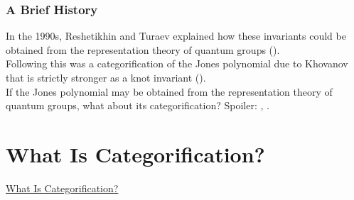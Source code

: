 \documentclass{beamer}
\begin{document}
\begin{frame}
\frametitle{A Brief History}
In the 1990s, Reshetikhin and Turaev explained how these invariants could be obtained from the representation theory of quantum groups (\textcolor{structure}{\cite{RT91}}).\\[2ex]
Following this was a categorification of the Jones polynomial due to Khovanov that is strictly stronger as a knot invariant (\textcolor{structure}{\cite{Kho00}}).\\[2ex]
If the Jones polynomial may be obtained from the representation theory of quantum groups, what about its categorification? Spoiler: \textcolor{structure}{\cite{Web13a}}, \textcolor{structure}{\cite{Web13b}}.
\end{frame}


\section{What Is Categorification?}

\begin{frame}
\centerline{\huge\textcolor{structure}{\underline{What Is Categorification?}}}
\end{frame}
\end{document}
